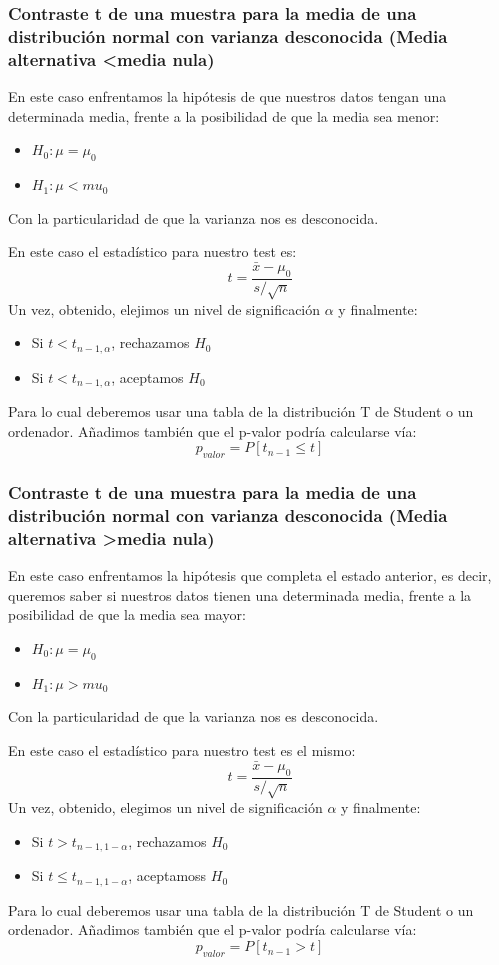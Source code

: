 \documentclass[a4paper,12pt]{article}
\begin{document}
 \subsubsection{Contraste t de una muestra para la media de una distribución normal con varianza desconocida (Media alternativa <media nula)}
 En este caso enfrentamos la hipótesis de que nuestros datos tengan una determinada media, frente a la posibilidad  de que la media sea menor: 
 \begin{itemize}
 	\item $H_0:\mu=\mu_0$
 	\item $H_1: \mu<mu_0$
 \end{itemize}
 Con la particularidad de que la varianza nos es desconocida.
 
 En este caso el estadístico para nuestro test es: 
 $$t=\frac{\bar{x}-\mu_0}{s/\sqrt{n}}$$
 Un vez, obtenido, elejimos un nivel de significación $\alpha$ y finalmente:
 \begin{itemize}
 	\item Si $t<t_{n-1,\alpha}$, rechazamos $H_0$
 	\item Si $t<t_{n-1,\alpha}$, aceptamos $H_0$
 \end{itemize}
 Para lo cual deberemos usar una tabla de la distribución T de Student o un ordenador.
 Añadimos también que el p-valor podría calcularse vía:
 $$p_{valor}=P[t_{n-1}\leq t]$$
 
 \subsubsection{Contraste t de una muestra para la media de una distribución normal con varianza desconocida (Media alternativa >media nula)}
 En este caso enfrentamos la hipótesis que completa el estado anterior, es decir, queremos saber si nuestros datos tienen una determinada media, frente a la posibilidad  de que la media sea mayor: 
 \begin{itemize}
 	\item $H_0:\mu=\mu_0$
 	\item $H_1: \mu>mu_0$
 \end{itemize}
 Con la particularidad de que la varianza nos es desconocida.
 
 En este caso el estadístico para nuestro test es el mismo: 
 $$t=\frac{\bar{x}-\mu_0}{s/\sqrt{n}}$$
 Un vez, obtenido, elegimos un nivel de significación $\alpha$ y finalmente:
 \begin{itemize}
 	\item Si $t>t_{n-1,1-\alpha}$, rechazamos $H_0$
 	\item Si $t\leq t_{n-1,1-\alpha}$, aceptamoss $H_0$
 \end{itemize}
 Para lo cual deberemos usar una tabla de la distribución T de Student o un ordenador.
 Añadimos también que el p-valor podría calcularse vía:
 $$p_{valor}=P[t_{n-1}> t]$$
 
\end{document}
